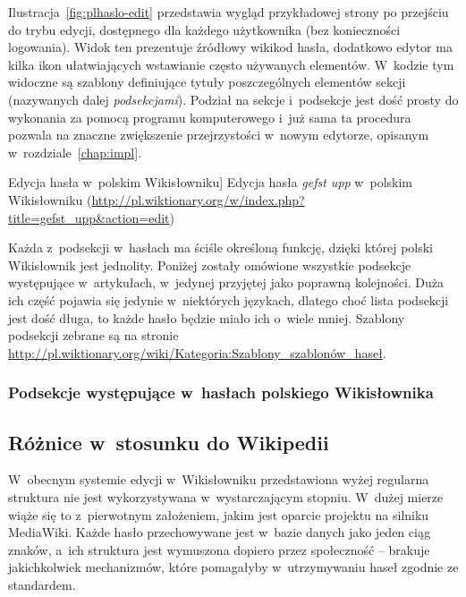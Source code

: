 Ilustracja~\ref{fig:plhaslo-edit} przedstawia wygląd przykładowej strony po przejściu do trybu edycji, dostępnego dla każdego użytkownika (bez konieczności logowania). Widok ten prezentuje źródłowy wikikod hasła, dodatkowo edytor ma kilka ikon ułatwiających wstawianie często używanych elementów. W~kodzie tym widoczne są szablony definiujące tytuły poszczególnych elementów sekcji (nazywanych dalej \emph{podsekcjami}). Podział na sekcje i~podsekcje jest dość prosty do wykonania za pomocą programu komputerowego i~już sama ta procedura pozwala na znaczne zwiększenie przejrzystości w~nowym edytorze, opisanym w~rozdziale~\ref{chap:impl}.

\begin{illustration}
	\caption
		[Edycja hasła w~polskim Wikisłowniku]
		{Edycja hasła \emph{gefst upp} w~polskim Wikisłowniku (\protect\url{http://pl.wiktionary.org/w/index.php?title=gefst_upp&action=edit})}
	\label{fig:plhaslo-edit}
\end{illustration}

Każda z~podsekcji w~hasłach ma ściśle określoną funkcję, dzięki której polski Wikisłownik jest jednolity. Poniżej zostały omówione wszystkie podsekcje występujące w~artykułach, w~jedynej przyjętej jako poprawną kolejności. Duża ich część pojawia się jedynie w~niektórych językach, dlatego choć lista podsekcji jest dość długa, to każde hasło będzie miało ich o~wiele mniej. Szablony podsekcji zebrane są na stronie \url{http://pl.wiktionary.org/wiki/Kategoria:Szablony_szablonów_haseł}.

\subsubsection{Podsekcje występujące w~hasłach polskiego Wikisłownika}


\subsection{Różnice w~stosunku do Wikipedii}
W~obecnym systemie edycji w~Wikisłowniku przedstawiona wyżej regularna struktura nie jest wykorzystywana w~wystarczającym stopniu. W~dużej mierze wiąże się to z~pierwotnym założeniem, jakim jest oparcie projektu na silniku MediaWiki. Każde hasło przechowywane jest w~bazie danych jako jeden ciąg znaków, a~ich struktura jest wymuszona dopiero przez społeczność -- brakuje jakichkolwiek mechanizmów, które pomagałyby w~utrzymywaniu haseł zgodnie ze standardem.

